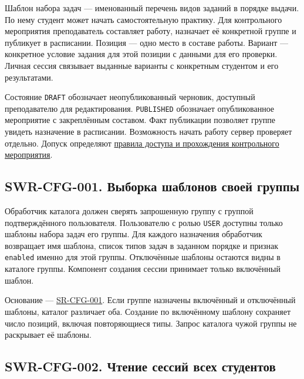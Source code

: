 \documentclass[12pt,a4paper]{article}
\begin{document}
\hypertarget{конфигурации-контрольные-мероприятия-и-модерация}{}

Шаблон набора задач --- именованный перечень видов заданий в порядке выдачи. По нему студент может начать самостоятельную практику. Для контрольного мероприятия преподаватель составляет работу, назначает её конкретной группе и публикует в расписании. Позиция --- одно место в составе работы. Вариант --- конкретное условие задания для этой позиции с данными для его проверки. Личная сессия связывает выданные варианты с конкретным студентом и его результатами.

Состояние \texttt{DRAFT} обозначает неопубликованный черновик, доступный преподавателю для редактирования. \texttt{PUBLISHED} обозначает опубликованное мероприятие с закреплённым составом. Факт публикации позволяет группе увидеть назначение в расписании. Возможность начать работу сервер проверяет отдельно. Допуск определяют {\href{../02\_Техническое\_задание/Техническое\_задание.pdf\#правила-доступа-и-прохождения-контрольного-мероприятия}{правила доступа и прохождения контрольного мероприятия}}.

\subsection{SWR-CFG-001. Выборка шаблонов своей группы}\label{swr-cfg-001-ux432ux44bux431ux43eux440ux43aux430-ux448ux430ux431ux43bux43eux43dux43eux432-ux441ux432ux43eux435ux439-ux433ux440ux443ux43fux43fux44b}

\hypertarget{swr-cfg-001-выборка-шаблонов-своей-группы}{}

\hypertarget{swr-cfg-001}{}

Обработчик каталога должен сверять запрошенную группу с группой подтверждённого пользователя. Пользователю с ролью \texttt{USER} доступны только шаблоны набора задач его группы. Для каждого назначения обработчик возвращает имя шаблона, список типов задач в заданном порядке и признак \texttt{enabled} именно для этой группы. Отключённые шаблоны остаются видны в каталоге группы. Компонент создания сессии принимает только включённый шаблон.

Основание --- {\href{../04\_Системные\_требования/DOC-05\_Системные\_требования.pdf\#sr-cfg-001}{SR-CFG-001}}. Если группе назначены включённый и отключённый шаблоны, каталог различает оба. Создание по включённому шаблону сохраняет число позиций, включая повторяющиеся типы. Запрос каталога чужой группы не раскрывает её шаблоны.

\subsection{SWR-CFG-002. Чтение сессий всех студентов}\label{swr-cfg-002-ux447ux442ux435ux43dux438ux435-ux441ux435ux441ux441ux438ux439-ux432ux441ux435ux445-ux441ux442ux443ux434ux435ux43dux442ux43eux432}
\end{document}
